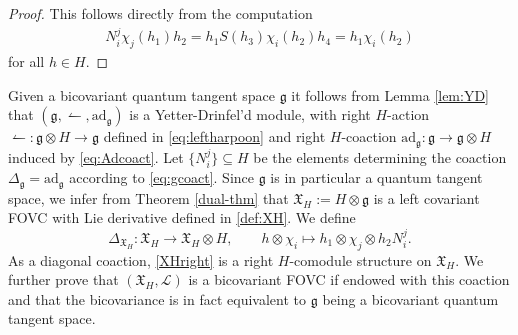 \documentclass{article}
\theoremstyle{definition}
\begin{document}
	\begin{proof}
		This follows directly from the computation
		\begin{align*}
			N_i^j\chi_j(h_1)h_2
			=h_1S(h_3)\chi_i(h_2)h_4
			=h_1\chi_i(h_2)
		\end{align*}
		for all $h\in H$.
	\end{proof}
	
	Given a bicovariant quantum tangent space $\mathfrak{g}$ it follows from Lemma \ref{lem:YD} that $(\mathfrak{g},\leftharpoonup,\mathrm{ad}_\mathfrak{g})$ is a Yetter-Drinfel'd module, with right $H$-action $\leftharpoonup\colon\mathfrak{g}\otimes H\to\mathfrak{g}$ defined in \eqref{eq:leftharpoon} and right $H$-coaction $\mathrm{ad}_\mathfrak{g}\colon\mathfrak{g}\to\mathfrak{g}\otimes H$ induced by \eqref{eq:Adcoact}. Let $\{N_i^j\}\subseteq H$ be the elements determining the coaction $\Delta_\mathfrak{g}=\mathrm{ad}_\mathfrak{g}$ according to \eqref{eq:gcoact}. Since $\mathfrak{g}$ is in particular a quantum tangent space, we infer from Theorem \ref{dual-thm} that $\mathfrak{X}_H:=H\otimes\mathfrak{g}$ is a left covariant FOVC with Lie derivative defined in \eqref{def:XH}. We define
	\begin{equation}\label{XHright}                 
		\Delta_{\mathfrak{X}_H}\colon\mathfrak{X}_H\to\mathfrak{X}_H\otimes H,\qquad
		h\otimes\chi_i\mapsto h_1\otimes\chi_j\otimes h_2N^j_i.
	\end{equation}
	As a diagonal coaction, \eqref{XHright} is a right $H$-comodule structure on $\mathfrak{X}_H$. We further prove that $(\mathfrak{X}_H,\mathscr{L})$ is a bicovariant FOVC if endowed with this coaction and that the bicovariance is in fact equivalent to $\mathfrak{g}$ being a bicovariant quantum tangent space.
	
\end{document}
